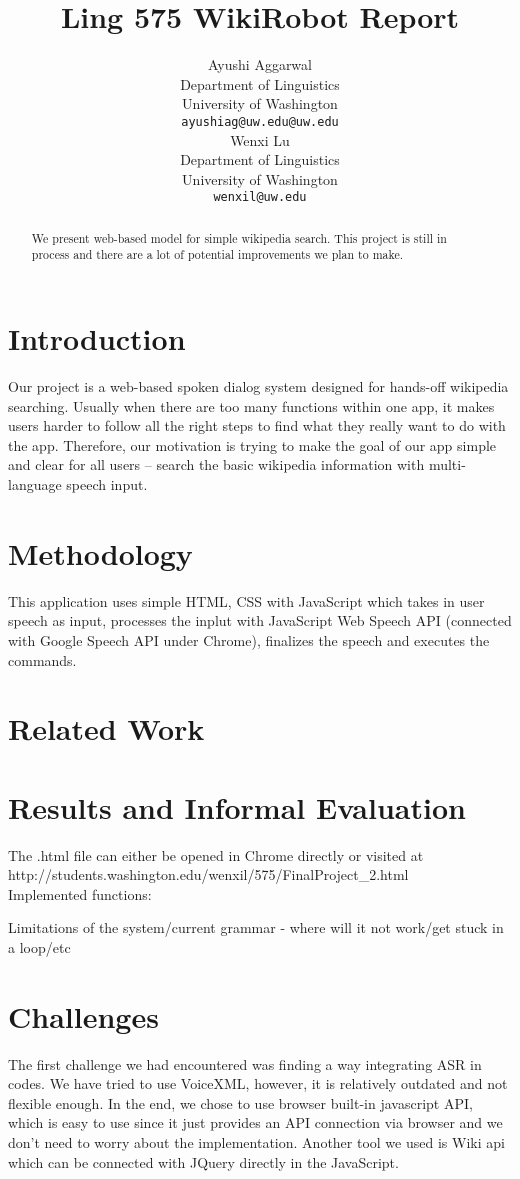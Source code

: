 \documentclass[11pt,a4paper]{article}
\title{Ling 575 WikiRobot Report}
\author{Ayushi Aggarwal\\
  Department of Linguistics \\
  University of Washington \\
  {\tt ayushiag@uw.edu@uw.edu} \\\And
  Wenxi Lu \\
  Department of Linguistics \\
  University of Washington \\
  {\tt wenxil@uw.edu} \\}
\date{}
\begin{document}
\maketitle

\begin{abstract}
We present web-based model for simple wikipedia search.
This project is still in process and there are a lot of potential improvements we plan to make. 
\end{abstract}



\section{Introduction}
Our project is a web-based spoken dialog system designed for hands-off wikipedia searching. Usually when there are too many functions within one app, it makes users harder to follow all the right steps to find what they really want to do with the app. Therefore, our motivation is trying to make the goal of our app simple and clear for all users -- search the basic wikipedia information with multi-language speech input.

\section{Methodology}
This application uses simple HTML, CSS with JavaScript which takes in user speech as input, processes the inplut with JavaScript Web Speech API (connected with Google Speech API under Chrome), finalizes the speech and executes the commands. 

\section{Related Work}



\section{Results and Informal Evaluation}
The .html file can either be opened in Chrome directly or visited at \\
http://students.washington.edu/wenxil/575/FinalProject\_2.html \\
Implemented functions: 

Limitations of the system/current grammar - where will it not work/get stuck in a loop/etc

\section{Challenges}
The first challenge we had encountered was finding a way integrating ASR in codes. We have tried to use VoiceXML, however, it is relatively outdated and not flexible enough. In the end, we chose to use browser built-in javascript API, which is easy to use since it just provides an API connection via browser and we don’t need to worry about the implementation. Another tool we used is Wiki api which can be connected with JQuery directly in the JavaScript. 
\end{document}
